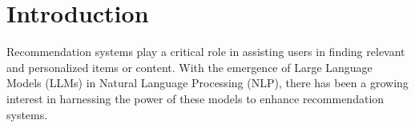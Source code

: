 \documentclass[sn-mathphys-num]{sn-jnl}%
\theoremstyle{thmstyleone}%
\theoremstyle{thmstyletwo}%
\theoremstyle{thmstylethree}%
\begin{document}
% 
% 
% 




\maketitle

\section{Introduction}\label{sec1}
Recommendation systems play a critical role in assisting users in finding relevant and personalized items or content. With the emergence of Large Language Models (LLMs) in Natural Language Processing (NLP), there has been a growing interest in harnessing the power of these models to enhance recommendation systems. 
\end{document}
